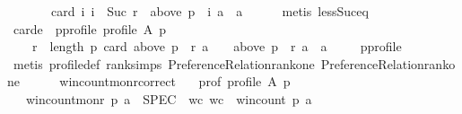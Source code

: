\begin{isabellebody}
\ \ \ \ \ \ \ card\ {\isacharbraceleft}{\kern0pt}i{\isachardot}{\kern0pt}\ i\ {\isacharless}{\kern0pt}\ Suc\ r\ {\isasymand}\ above\ {\isacharparenleft}{\kern0pt}p\ {\isacharbang}{\kern0pt}\ i{\isacharparenright}{\kern0pt}\ a\ {\isacharequal}{\kern0pt}\ {\isacharbraceleft}{\kern0pt}a{\isacharbraceright}{\kern0pt}{\isacharbraceright}{\kern0pt}{\isachardoublequoteclose}\isanewline
\ \ \ \ \isamarkupfalse%
\ {\isacharparenleft}{\kern0pt}metis\ less{\isacharunderscore}{\kern0pt}Suc{\isacharunderscore}{\kern0pt}eq{\isacharparenright}{\kern0pt}\isanewline
{}\isamarkupfalse%
%
\endisatagproof
{\isafoldproof}%
%
\isadelimproof
\isanewline
%
\endisadelimproof
\isanewline
{}\isamarkupfalse%
\ carde{\isacharcolon}{\kern0pt}\ \ pprofile{\isacharcolon}{\kern0pt}\ {\isachardoublequoteopen}profile\ A\ p{\isachardoublequoteclose}\isanewline
\ \ \ {\isachardoublequoteopen}{\isasymforall}\ r\ {\isacharless}{\kern0pt}\ length\ p{\isachardot}{\kern0pt}\ {\isacharparenleft}{\kern0pt}card\ {\isacharparenleft}{\kern0pt}above\ {\isacharparenleft}{\kern0pt}p\ {\isacharbang}{\kern0pt}\ r{\isacharparenright}{\kern0pt}\ a{\isacharparenright}{\kern0pt}\ {\isacharequal}{\kern0pt}\ {}{\isacharparenright}{\kern0pt}\ {\isacharequal}{\kern0pt}\ {\isacharparenleft}{\kern0pt}above\ {\isacharparenleft}{\kern0pt}p\ {\isacharbang}{\kern0pt}\ r{\isacharparenright}{\kern0pt}\ a\ {\isacharequal}{\kern0pt}\ {\isacharbraceleft}{\kern0pt}a{\isacharbraceright}{\kern0pt}{\isacharparenright}{\kern0pt}{\isachardoublequoteclose}\ \isanewline
%
\isadelimproof
\ \ %
\endisadelimproof
%
\isatagproof
{}\isamarkupfalse%
\ pprofile\isanewline
\ \ \ \ \isamarkupfalse%
\ {\isacharparenleft}{\kern0pt}metis\ profile{\isacharunderscore}{\kern0pt}def\ rank{\isachardot}{\kern0pt}simps\ Preference{\isacharunderscore}{\kern0pt}Relation{\isachardot}{\kern0pt}rankone{}\ Preference{\isacharunderscore}{\kern0pt}Relation{\isachardot}{\kern0pt}rankone{}{\isacharparenright}{\kern0pt}%
\endisatagproof
{\isafoldproof}%
%
\isadelimproof
\isanewline
%
\endisadelimproof
\ \ \ \ \isanewline
{}\isamarkupfalse%
\ win{\isacharunderscore}{\kern0pt}count{\isacharunderscore}{\kern0pt}mon{\isacharunderscore}{\kern0pt}r{\isacharunderscore}{\kern0pt}correct{\isacharcolon}{\kern0pt}\isanewline
\ \ \ prof{\isacharcolon}{\kern0pt}\ {\isachardoublequoteopen}profile\ A\ p{\isachardoublequoteclose}\isanewline
\ \ \ {\isachardoublequoteopen}win{\isacharunderscore}{\kern0pt}count{\isacharunderscore}{\kern0pt}mon{\isacharunderscore}{\kern0pt}r\ p\ a\ {\isasymle}\ SPEC\ {\isacharparenleft}{\kern0pt}{\isasymlambda}\ wc{\isachardot}{\kern0pt}\ wc\ {\isacharequal}{\kern0pt}\ win{\isacharunderscore}{\kern0pt}count\ p\ a{\isacharparenright}{\kern0pt}{\isachardoublequoteclose}\isanewline

\end{isabellebody}

